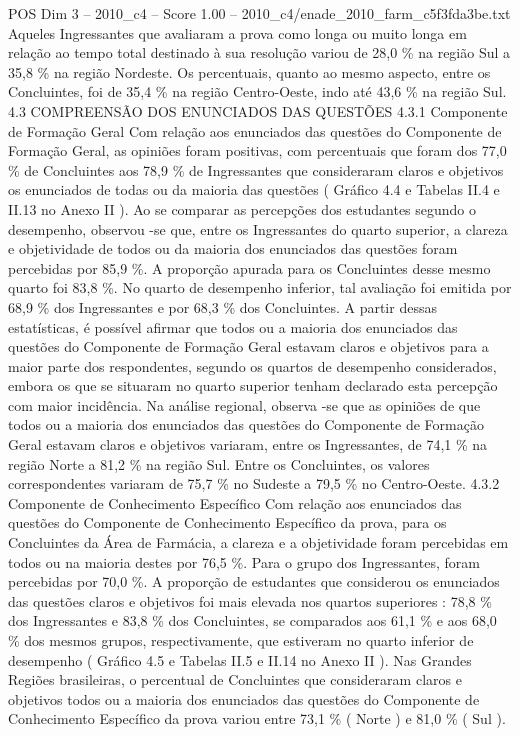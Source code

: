 \begin{textsample}{POS Dim 3 – 2010\_c4 – Score 1.00 – 2010\_c4/enade\_2010\_farm\_c5f3fda3be.txt}
Aqueles Ingressantes que avaliaram a prova como longa ou muito longa em relação ao tempo total destinado à sua resolução variou de 28,0 \% na região Sul a 35,8 \% na região Nordeste.
Os percentuais, quanto ao mesmo aspecto, entre os Concluintes, foi de 35,4 \% na região Centro-Oeste, indo até 43,6 \% na região Sul. 4.3 COMPREENSÃO DOS ENUNCIADOS DAS QUESTÕES 4.3.1 Componente de Formação Geral Com relação aos enunciados das questões do Componente de Formação Geral, as opiniões foram positivas, com percentuais que foram dos 77,0 \% de Concluintes aos 78,9 \% de Ingressantes que consideraram claros e objetivos os enunciados de todas ou da maioria das questões ( Gráfico 4.4 e Tabelas II.4 e II.13 no Anexo II ).
Ao se comparar as percepções dos estudantes segundo o desempenho, observou -se que, entre os Ingressantes do quarto superior, a clareza e objetividade de todos ou da maioria dos enunciados das questões foram percebidas por 85,9 \%.
A proporção apurada para os Concluintes desse mesmo quarto foi 83,8 \%.
No quarto de desempenho inferior, tal avaliação foi emitida por 68,9 \% dos Ingressantes e por 68,3 \% dos Concluintes.
A partir dessas estatísticas, é possível afirmar que todos ou a maioria dos enunciados das questões do Componente de Formação Geral estavam claros e objetivos para a maior parte dos respondentes, segundo os quartos de desempenho considerados, embora os que se situaram no quarto superior tenham declarado esta percepção com maior incidência.
Na análise regional, observa -se que as opiniões de que todos ou a maioria dos enunciados das questões do Componente de Formação Geral estavam claros e objetivos variaram, entre os Ingressantes, de 74,1 \% na região Norte a 81,2 \% na região Sul.
Entre os Concluintes, os valores correspondentes variaram de 75,7 \% no Sudeste a 79,5 \% no Centro-Oeste. 4.3.2 Componente de Conhecimento Específico Com relação aos enunciados das questões do Componente de Conhecimento Específico da prova, para os Concluintes da Área de Farmácia, a clareza e a objetividade foram percebidas em todos ou na maioria destes por 76,5 \%.
Para o grupo dos Ingressantes, foram percebidas por 70,0 \%.
A proporção de estudantes que considerou os enunciados das questões claros e objetivos foi mais elevada nos quartos superiores : 78,8 \% dos Ingressantes e 83,8 \% dos Concluintes, se comparados aos 61,1 \% e aos 68,0 \% dos mesmos grupos, respectivamente, que estiveram no quarto inferior de desempenho ( Gráfico 4.5 e Tabelas II.5 e II.14 no Anexo II ).
Nas Grandes Regiões brasileiras, o percentual de Concluintes que consideraram claros e objetivos todos ou a maioria dos enunciados das questões do Componente de Conhecimento Específico da prova variou entre 73,1 \% ( Norte ) e 81,0 \% ( Sul ).

\end{textsample}
